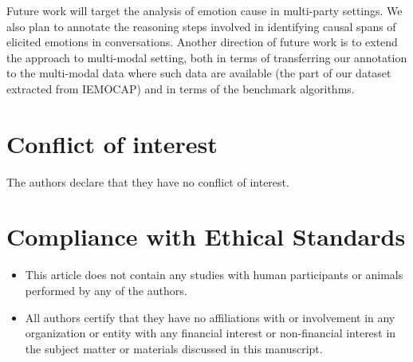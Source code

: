 \documentclass[smallextended]{svjour3}
\newcommand\0{\hphantom{0}}
\begin{document}
Future work will target the analysis of emotion cause in multi-party settings. We also plan to annotate the reasoning steps involved in identifying causal spans of elicited emotions in conversations.
Another direction of future work is to extend the approach to multi-modal setting, both in terms of transferring our annotation to the multi-modal data where such data are available (the part of our dataset extracted from IEMOCAP) and in terms of the benchmark algorithms.



\section*{Conflict of interest}
The authors declare that they have no conflict of interest.
\section*{Compliance with Ethical Standards}
\begin{itemize}
\item This article does not contain any studies with human participants or animals performed by any of the authors.
    \item All authors certify that they have no affiliations with or involvement in any organization or entity with any financial interest or non-financial interest in the subject matter or materials discussed in this manuscript.
\end{itemize}

      
\end{document}
